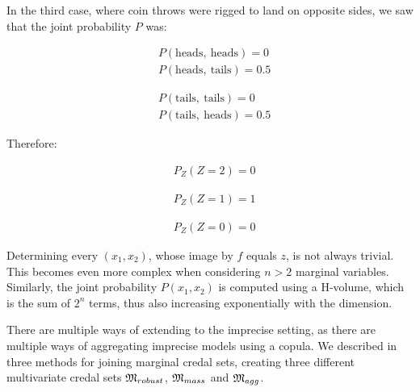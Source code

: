 \begin{example}
    In the third case, where coin throws were rigged to land on opposite sides, we saw that the joint probability $P$ was:\\
    \noindent\begin{minipage}[b]{0.5\linewidth}
    \begin{align*}
        & P(\text{heads}, ~\text{heads}) = 0\\
        & P(\text{heads}, ~\text{tails}) = 0.5
    \end{align*}
    \end{minipage}
    \begin{minipage}[b]{0.5\linewidth}
    \begin{align*}
        & P(\text{tails}, ~\text{tails}) = 0\\
        & P(\text{tails}, ~\text{heads}) = 0.5
    \end{align*}
    \end{minipage}
    Therefore:\\
    \begin{minipage}[b]{0.33\linewidth}
    \begin{align*}
        & P_Z(Z=2) = 0
    \end{align*}
    \end{minipage}
    \begin{minipage}[b]{0.33\linewidth}
    \begin{align*}
        & P_Z(Z=1) = 1
    \end{align*}
    \end{minipage}
    \begin{minipage}[b]{0.33\linewidth}
    \begin{align*}
        & P_Z(Z=0) = 0
    \end{align*}
    \end{minipage}
\end{example}

Determining every $(x_1, x_2)$, whose image by $f$ equals $z$, is not always trivial. This becomes even more complex when considering $n>2$ marginal variables. Similarly, the joint probability $P(x_1,x_2)$ is computed using a H-volume, which is the sum of $2^n$ terms, thus also increasing exponentially with the dimension.

There are multiple ways of extending  to the imprecise setting, as there are multiple ways of aggregating imprecise models using a copula. We described in  three methods for joining marginal credal sets, creating three different multivariate credal sets $\mathfrak{M}_{robust}$, $\mathfrak{M}_{mass}$ and $\mathfrak{M}_{agg}$.

